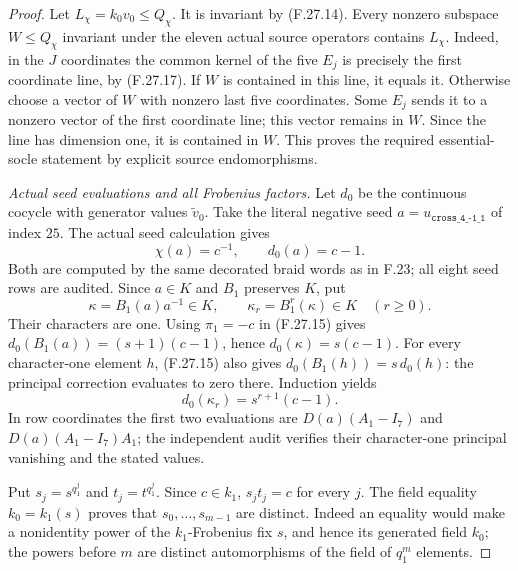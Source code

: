\begin{proof}
Let $L_\chi=k_0v_0\leq Q_\chi$. It is invariant
by (F.27.14). Every nonzero subspace $W\leq Q_\chi$
invariant under the eleven actual source operators
contains $L_\chi$. Indeed, in the $J$ coordinates
the common kernel of the five $E_j$ is precisely
the first coordinate line, by (F.27.17).
If $W$ is contained in this line, it equals it.
Otherwise choose a vector of $W$ with nonzero
last five coordinates. Some $E_j$ sends it to
a nonzero vector of the first coordinate line;
this vector remains in $W$. Since the line has
dimension one, it is contained in $W$.
This proves the required essential-socle statement
by explicit source endomorphisms.

\emph{Actual seed evaluations and all Frobenius factors.}
Let $d_0$ be the continuous cocycle with generator
values $\widetilde v_0$. Take the literal negative
seed $a=u_{\texttt{cross\_4\_-1\_1}}$ of index $25$.
The actual seed calculation gives
\[
                   \chi(a)=c^{-1},\qquad d_0(a)=c-1.
                                                               \tag{F.27.18}
\]
Both are computed by the same decorated braid
words as in F.23; all eight seed rows are audited.
Since $a\in K$ and $B_1$ preserves $K$, put
\[
          \kappa=B_1(a)a^{-1}\in K,
          \qquad \kappa_r=B_1^r(\kappa)\in K\quad(r\geq0).
                                                               \tag{F.27.19}
\]
Their characters are one. Using $\pi_1=-c$ in
(F.27.15) gives
$d_0(B_1(a))=(s+1)(c-1)$, hence
$d_0(\kappa)=s(c-1)$.
For every character-one element $h$, (F.27.15)
also gives $d_0(B_1(h))=s\,d_0(h)$: the principal
correction evaluates to zero there. Induction yields
\[
                         d_0(\kappa_r)=s^{r+1}(c-1).
                                                               \tag{F.27.20}
\]
In row coordinates the first two evaluations
are $D(a)(A_1-I_7)$ and $D(a)(A_1-I_7)A_1$;
the independent audit verifies their character-one
principal vanishing and the stated values.

Put $s_j=s^{q_1^j}$ and $t_j=t^{q_1^j}$.
Since $c\in k_1$, $s_jt_j=c$ for every $j$.
The field equality $k_0=k_1(s)$ proves that
$s_0,\ldots,s_{m-1}$ are distinct. Indeed an
equality would make a nonidentity power of the
$k_1$-Frobenius fix $s$, and hence its generated
field $k_0$; the powers before $m$ are distinct
automorphisms of the field of $q_1^m$ elements.


\end{proof}
